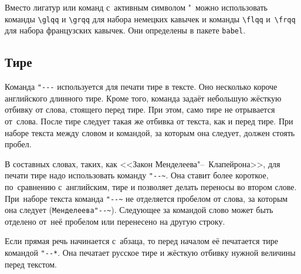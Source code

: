 Вместо лигатур или команд с~активным символом "\ можно использовать команды \verb|\glqq| и \verb|\grqq| для набора немецких кавычек и команды \verb|\flqq| и~\verb|\frqq| для набора французских кавычек. Они определены в пакете \verb|babel|.

\subsection{Тире}
Команда \verb|"---| используется для печати тире в тексте. Оно несколько короче английского длинного тире. Кроме того, команда задаёт небольшую жёсткую отбивку от слова, стоящего перед тире. При этом, само тире не отрывается от~слова. После тире следует такая же отбивка от текста, как и перед тире. При наборе текста между словом и командой, за которым она следует, должен стоять пробел.

В составных словах, таких, как <<Закон Менделеева"--~Клапейрона>>, для печати тире надо использовать команду \verb|"--~|. Она ставит более короткое, по~сравнению с~английским, тире и позволяет делать переносы во втором слове. При~наборе текста команда \verb|"--~| не отделяется пробелом от слова, за которым она следует (\verb|Менделеева"--~|). Следующее за командой слово может быть  отделено от~неё пробелом или перенесено на другую строку.

Если прямая речь начинается с~абзаца, то перед началом её печатается тире командой
\verb|"--*|. Она печатает русское тире и жёсткую отбивку нужной величины перед текстом.
